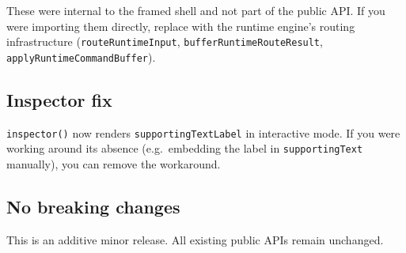 These were internal to the framed shell and not part of the public API. If you were importing them directly, replace with the runtime engine's routing infrastructure (\texttt{r\allowbreak{}o\allowbreak{}u\allowbreak{}t\allowbreak{}e\allowbreak{}R\allowbreak{}u\allowbreak{}n\allowbreak{}t\allowbreak{}i\allowbreak{}m\allowbreak{}e\allowbreak{}I\allowbreak{}n\allowbreak{}p\allowbreak{}u\allowbreak{}t}, \texttt{b\allowbreak{}u\allowbreak{}f\allowbreak{}f\allowbreak{}e\allowbreak{}r\allowbreak{}R\allowbreak{}u\allowbreak{}n\allowbreak{}t\allowbreak{}i\allowbreak{}m\allowbreak{}e\allowbreak{}R\allowbreak{}o\allowbreak{}u\allowbreak{}t\allowbreak{}e\allowbreak{}R\allowbreak{}e\allowbreak{}s\allowbreak{}u\allowbreak{}l\allowbreak{}t}, \texttt{a\allowbreak{}p\allowbreak{}p\allowbreak{}l\allowbreak{}y\allowbreak{}R\allowbreak{}u\allowbreak{}n\allowbreak{}t\allowbreak{}i\allowbreak{}m\allowbreak{}e\allowbreak{}C\allowbreak{}o\allowbreak{}m\allowbreak{}m\allowbreak{}a\allowbreak{}n\allowbreak{}d\allowbreak{}B\allowbreak{}u\allowbreak{}f\allowbreak{}f\allowbreak{}e\allowbreak{}r}).

\subsection{Inspector fix}\label{record-265-inspector-fix}

\texttt{i\allowbreak{}n\allowbreak{}s\allowbreak{}p\allowbreak{}e\allowbreak{}c\allowbreak{}t\allowbreak{}o\allowbreak{}r\allowbreak{}(\allowbreak{})} now renders \texttt{s\allowbreak{}u\allowbreak{}p\allowbreak{}p\allowbreak{}o\allowbreak{}r\allowbreak{}t\allowbreak{}i\allowbreak{}n\allowbreak{}g\allowbreak{}T\allowbreak{}e\allowbreak{}x\allowbreak{}t\allowbreak{}L\allowbreak{}a\allowbreak{}b\allowbreak{}e\allowbreak{}l} in interactive mode. If you were working around its absence (e.g.~embedding the label in \texttt{s\allowbreak{}u\allowbreak{}p\allowbreak{}p\allowbreak{}o\allowbreak{}r\allowbreak{}t\allowbreak{}i\allowbreak{}n\allowbreak{}g\allowbreak{}T\allowbreak{}e\allowbreak{}x\allowbreak{}t} manually), you can remove the workaround.

\subsection{No breaking changes}\label{record-265-no-breaking-changes}

This is an additive minor release. All existing public APIs remain unchanged.

